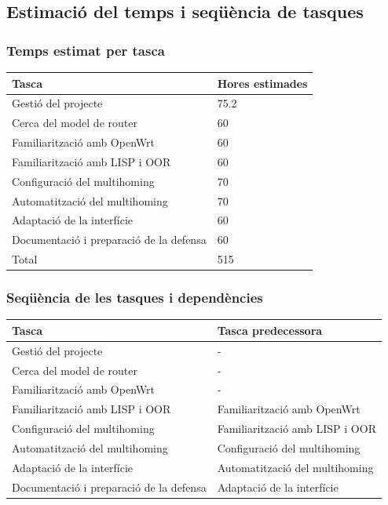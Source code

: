 \documentclass[11pt]{article}
\begin{document}
\subsection{Estimació del temps i seqüència de tasques}
\subsubsection{Temps estimat per tasca}
\begin{center}
	\begin{tabular}{| l | l |}
		\hline
		Tasca & Hores estimades \\ \hline
		Gestió del projecte & 75.2 \\ \hline
		Cerca del model de router & 60 \\ \hline
		Familiarització amb OpenWrt & 60 \\ \hline
		Familiarització amb LISP i OOR & 60 \\ \hline
		Configuració del multihoming & 70 \\ \hline
		Automatització del multihoming & 70 \\ \hline
		Adaptació de la interfície & 60 \\ \hline
		Documentació i preparació de la defensa & 60 \\ \hline
		Total & 515 \\ \hline
		\hline
	\end{tabular}
\end{center}

\subsubsection{Seqüència de les tasques i dependències}
\begin{center}
	\begin{tabular}{| l | l |}
		\hline
		Tasca & Tasca predecessora \\ \hline
		Gestió del projecte & - \\ \hline
		Cerca del model de router & - \\ \hline
		Familiarització amb OpenWrt & - \\ \hline
		Familiarització amb LISP i OOR & Familiarització amb OpenWrt \\ \hline
		Configuració del multihoming & Familiarització amb LISP i OOR \\ \hline
		Automatització del multihoming & Configuració del multihoming \\ \hline
		Adaptació de la interfície & Automatització del multihoming \\ \hline
		Documentació i preparació de la defensa & Adaptació de la interfície \\ \hline
		\hline
	\end{tabular}
\end{center}
\newpage
\end{document}
